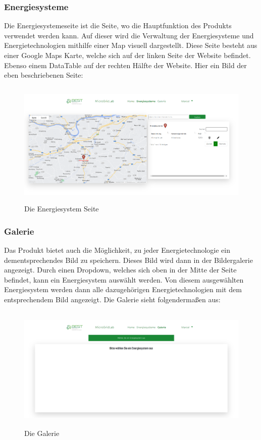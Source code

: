 \subsubsection{Energiesysteme}
Die Energiesystemeseite ist die Seite, wo die Hauptfunktion des Produkts verwendet werden kann. Auf dieser wird die Verwaltung der Energiesysteme und Energietechnologien mithilfe einer Map visuell dargestellt. Diese Seite besteht aus einer Google Maps Karte, welche sich auf der linken Seite der Website befindet. Ebenso einem DataTable auf der rechten Hälfte der Website. Hier ein Bild der eben beschriebenen Seite:
\begin{figure}[h]
	\centering
	\includegraphics[height=6cm,width=14cm]{images/EnergiesystemSeite}
	\caption{Die Energiesystem Seite}
	\label{fig:Energiesystem Seite}
\end{figure}

\subsubsection{Galerie}
Das Produkt bietet auch die Möglichkeit, zu jeder Energietechnologie ein dementsprechendes Bild zu speichern. Dieses Bild wird dann in der Bildergalerie angezeigt. Durch einen Dropdown, welches sich oben in der Mitte der Seite befindet, kann ein Energiesystem auswählt werden. Von diesem ausgewählten Energiesystem werden dann alle dazugehörigen Energietechnologien mit dem entsprechendem Bild angezeigt. Die Galerie sieht folgendermaßen aus:
\begin{figure}[h]
	\centering
	\includegraphics[height=6cm,width=14cm]{images/GalerieSeite}
	\caption{Die Galerie}
	\label{fig:Galerie}
\end{figure}


